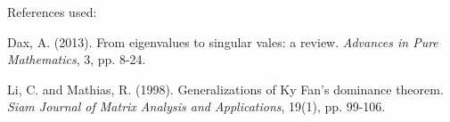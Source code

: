 \documentclass{letter}
\begin{document}
{    References used: 
    
    Dax, A. (2013). From eigenvalues to singular vales: a review. \emph{Advances in Pure Mathematics}, 3, pp. 8-24.

    Li, C. and Mathias, R. (1998). Generalizations of Ky Fan's dominance theorem. \emph{Siam Journal of Matrix Analysis and Applications}, 19(1), pp. 99-106.}
\end{document}
